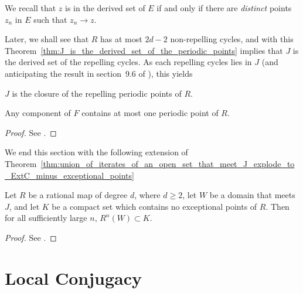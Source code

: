 \begin{remark}
    We recall that $z$ is in the derived set of $E$ if and only if there are
    \emph{distinct} points $z_n$ in $E$ such that $z_n \to z$.
\end{remark}

Later, we shall see that $R$ has at most $2d - 2$ non-repelling cycles, and with
this Theorem~\ref{thm:J_is_the_derived_set_of_the_periodic_points} implies that
$J$ is the derived set of the repelling cycles. As each repelling cycles lies in
$J$ (and anticipating the result in section~9.6 of \cite{Beardon1991}), this
yields

\begin{theorem}[$J = \closure{\{\text{repelling periodic points}\}}$]
    $J$ is the closure of the repelling periodic points of $R$.
\end{theorem}

\begin{lemma}
    \label{lem:components_of_F_have_at_most_one_periodic_point}
    Any component of $F$ contains at most one periodic point of $R$.
\end{lemma}
\begin{proof}
    See \cite[149]{Beardon1991}.
\end{proof}

We end this section with the following extension of
Theorem~\ref{thm:union_of_iterates_of_an_open_set_that_meet_J_explode_to_ExtC_minus_exceptional_points}

\begin{theorem}
    Let $R$ be a rational map of degree $d$, where $d \geq 2$, let $W$ be a
    domain that meets $J$, and let $K$ be a compact set which contains no
    exceptional points of $R$. Then for all sufficiently large $n$, $R^n(W)
    \subset K$.
\end{theorem}
\begin{proof}
    See \cite[149--150]{Beardon1991}.
\end{proof}

\section{Local Conjugacy}
\label{sec:local_conjugacy}

